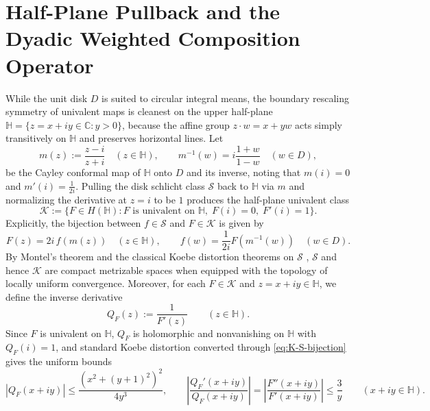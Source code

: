 \documentclass[12pt]{article}
\def\C{\mathbb{C}}
\def\H{\mathbb{H}}
\def\K{\mathcal{K}}
\def\S{\mathcal{S}}
\theoremstyle{definition}
\numberwithin{equation}{section}
\begin{document}
\section{Half-Plane Pullback and the Dyadic Weighted Composition Operator}

While the unit disk $D$ is suited to circular integral means, the boundary rescaling symmetry of univalent maps is cleanest on the upper half-plane $\H = \{z = x + iy \in \C : y > 0\}$, because the affine group $z \cdot w = x + yw$ acts simply transitively on $\H$ and preserves horizontal lines. Let
\begin{equation}\label{eq:cayley-def}
  m(z) := \frac{z - i}{z + i} \quad (z \in \H), \qquad m^{-1}(w) = i \frac{1 + w}{1 - w} \quad (w \in D),
\end{equation}
be the Cayley conformal map of $\H$ onto $D$ and its inverse, noting that $m(i) = 0$ and $m'(i) = \frac{1}{2i}$. Pulling the disk schlicht class $\S$ back to $\H$ via $m$ and normalizing the derivative at $z = i$ to be $1$ produces the half-plane univalent class
\begin{equation}\label{eq:K-class-def}
  \K := \Big\{F \in H(\H) : F \text{ is univalent on } \H,\; F(i) = 0,\; F'(i) = 1\Big\}.
\end{equation}
Explicitly, the bijection between $f \in \S$ and $F \in \K$ is given by
\begin{equation}\label{eq:K-S-bijection}
  F(z) = 2i \, f(m(z)) \quad (z \in \H), \qquad f(w) = \frac{1}{2i} F(m^{-1}(w)) \quad (w \in D).
\end{equation}
By Montel's theorem and the classical Koebe distortion theorems on $\S$ \cite[Theorem~2.5]{Dur83}, $\S$ and hence $\K$ are compact metrizable spaces when equipped with the topology of locally uniform convergence. Moreover, for each $F \in \K$ and $z = x+iy \in \H$, we define the inverse derivative
\begin{equation}\label{eq:QF-def}
  Q_F(z) := \frac{1}{F'(z)} \qquad (z \in \H).
\end{equation}
Since $F$ is univalent on $\H$, $Q_F$ is holomorphic and nonvanishing on $\H$ with $Q_F(i) = 1$, and standard Koebe distortion converted through \eqref{eq:K-S-bijection} gives the uniform bounds
\begin{equation}\label{eq:QF-distortion}
  |Q_F(x+iy)| \le \frac{(x^2 + (y+1)^2)^2}{4 y^3}, \qquad \left|\frac{Q_F'(x+iy)}{Q_F(x+iy)}\right| = \left|\frac{F''(x+iy)}{F'(x+iy)}\right| \le \frac{3}{y} \qquad (x+iy \in \H).
\end{equation}
\end{document}

